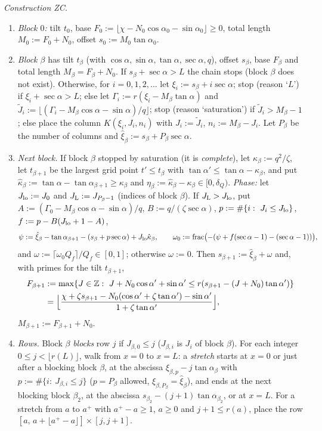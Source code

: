 \documentclass[11pt]{amsart}
\newcommand{\Z}{\mathbb Z}
\newcommand{\ca}{\cos\alpha}
\newcommand{\sa}{\sin\alpha}
\newcommand{\ta}{\tan\alpha}
\newcommand{\se}{\sec\alpha}
\newcommand{\caz}{\cos\alpha_0}
\newcommand{\saz}{\sin\alpha_0}
\newcommand{\taz}{\tan\alpha_0}
\theoremstyle{definition}
\theoremstyle{remark}
\numberwithin{equation}{section}
\begin{document}
\emph{Construction ZC.}
\begin{enumerate}[label=(Z\arabic*)]
\item \emph{Block $0$:} tilt $t_0$, base $F_0:=\lfloor\chi-N_0\caz-\saz\rfloor\ge0$, total length $M_0:=F_0+N_0$, offset
$s_0:=M_0\taz$.
\item \emph{Block $\beta$} has tilt $t_\beta$ (with $\ca,\sa,\ta,\se,q$), offset $s_\beta$, base $F_\beta$ and total
length $M_\beta=F_\beta+N_0$. If $s_\beta+\se>L$ the chain stops (block $\beta$ does not exist). Otherwise, for
$i=0,1,2,\dots$ let $\xi_i:=s_\beta+i\se$; stop (reason `$L$') if $\xi_i+\se>L$; else let
$\Gamma_i:=r(\xi_i-M_\beta\ta)$ and $\tilde J_i:=\lfloor(\Gamma_i-M_\beta\ca-\sa)/q\rfloor$; stop (reason
`saturation') if $\tilde J_i>M_\beta-1$; else place the column $K(\xi_i,J_i,n_i)$ with $J_i:=\tilde J_i$,
$n_i:=M_\beta-J_i$. Let $P_\beta$ be the number of columns and $\hat\xi_\beta:=s_\beta+P_\beta\se$.
\item \emph{Next block.} If block $\beta$ stopped by saturation (it is \emph{complete}), let $\kappa_\beta:=q^2/\zeta$,
let $t_{\beta+1}$ be the largest grid point $t'\le t_\beta$ with $\tan\alpha'\le\ta-\kappa_\beta$, and put
$\hat\kappa_\beta:=\ta-\tan\alpha_{\beta+1}\ge\kappa_\beta$ and $\eta_\beta:=\hat\kappa_\beta-\kappa_\beta\in[0,\delta_Q)$.
\emph{Phase:} let $J_{\rm lo}:=J_0$ and $J_{\rm L}:=J_{P_\beta-1}$ (indices of block $\beta$). If $J_{\rm L}>J_{\rm lo}$, put
$A:=(\Gamma_0-M_\beta\ca-\sa)/q$, $B:=q/(\zeta\se)$, $p:=\#\{i:\ J_i\le J_{\rm lo}\}$, $f:=p-B(J_{\rm lo}+1-A)$,
\[
\psi:=\hat\xi_\beta-\tan\alpha_{\beta+1}-(s_\beta+p\se)+J_{\rm lo}\hat\kappa_\beta,\qquad
\omega_0:=\operatorname{frac}\bigl(-(\psi+f(\se-1)-(\se-1))\bigr),
\]
and $\omega:=\lceil\omega_0Q_f\rceil/Q_f\in[0,1]$; otherwise $\omega:=0$. Then $s_{\beta+1}:=\hat\xi_\beta+\omega$ and,
with primes for the tilt $t_{\beta+1}$,
\begin{align*}
F_{\beta+1}&:=\max\{J\in\Z:\ J+N_0\ca'+\sa'\le r(s_{\beta+1}-(J+N_0)\ta')\}\\
&=\Bigl\lfloor\frac{\chi+\zeta s_{\beta+1}-N_0(\ca'+\zeta\ta')-\sa'}{1+\zeta\ta'}\Bigr\rfloor,
\end{align*}
$M_{\beta+1}:=F_{\beta+1}+N_0$.
\item \emph{Rows.} Block $\beta$ \emph{blocks} row $j$ if $J_{\beta,0}\le j$ ($J_{\beta,i}$ is $J_i$ of block $\beta$).
For each integer $0\le j<\lfloor r(L)\rfloor$, walk from $x=0$ to $x=L$: a \emph{stretch} starts at $x=0$ or just after
a blocking block $\beta$, at the abscissa $\xi_{\beta,p}-j\tan\alpha_\beta$ with $p:=\#\{i:\ J_{\beta,i}\le j\}$
($p=P_\beta$ allowed, $\xi_{\beta,P_\beta}=\hat\xi_\beta$), and ends at the next blocking block $\beta_2$, at the
abscissa $s_{\beta_2}-(j+1)\tan\alpha_{\beta_2}$, or at $x=L$. For a stretch from $a$ to $a^+$ with $a^+-a\ge1$, $a\ge0$
and $j+1\le r(a)$, place the row $[a,\,a+\lfloor a^+-a\rfloor]\times[j,j+1]$.
\end{enumerate}
\end{document}
